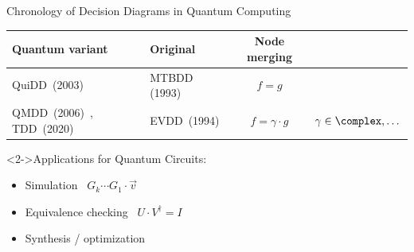 \begin{refframe}{Chronology of Decision Diagrams in Quantum Computing}
	
\vspace{-.8em}

	
\begin{table}
\centering\footnotesize
\def\arraystretch{1.5}
\begin{tabular}{|p{4.5cm}|p{1.5cm}|c|c|}
\hline
\textbf{Quantum variant}	&
\textbf{Original}				& \textbf{Node merging} &  \\\hline
 QuiDD~(2003)~\cite{viamontes2003improving}					    &MTBDD (1993)  & $f = g$  &  \\
 QMDD~(2006)~\cite{qmdd}, TDD~(2020)~\cite{hong2022tensor}   & EVDD~(1994)  &$f = \gamma\cdot g$   & $\gamma \in \complex, \dots$  \\
\hline
\end{tabular}
\end{table}

\vspace{-.3em}



\begin{block}<2->{Applications for Quantum Circuits:}
\begin{itemize}
	\item Simulation~\cite{viamontes2003improving,8382253}			\hfill   $G_k\cdots G_1 \cdot \vec v$
	\item Equivalence checking~\cite{burgholzer2020improved} \hfill $U \cdot V^\dagger = I$
	\item Synthesis / optimization~\cite{abdollahi2006analysis,amy2013meet,zulehner2017improving}
\end{itemize}
\end{block}



\end{refframe}
